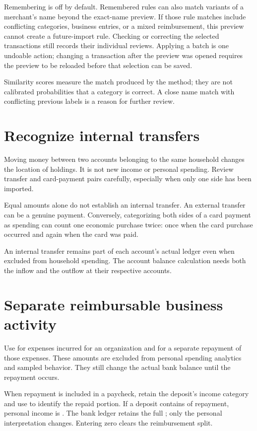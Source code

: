 Remembering is off by default. Remembered rules can also match variants of a merchant's name beyond the exact-name preview. If those rule matches include conflicting categories, business entries, or a mixed reimbursement, this preview cannot create a future-import rule. Checking or correcting the selected transactions still records their individual reviews. Applying a batch is one undoable action; changing a transaction after the preview was opened requires the preview to be reloaded before that selection can be saved.

Similarity scores measure the match produced by the method; they are not calibrated probabilities that a category is correct. A close name match with conflicting previous labels is a reason for further review.

\section{Recognize internal transfers}
Moving money between two accounts belonging to the same household changes the location of holdings. It is not new income or personal spending. Review transfer and card-payment pairs carefully, especially when only one side has been imported.

Equal amounts alone do not establish an internal transfer. An external transfer can be a genuine payment. Conversely, categorizing both sides of a card payment as spending can count one economic purchase twice: once when the card purchase occurred and again when the card was paid.

An internal transfer remains part of each account's actual ledger even when excluded from household spending. The account balance calculation needs both the inflow and the outflow at their respective accounts.

\section{Separate reimbursable business activity}
Use  for expenses incurred for an organization and for a separate repayment of those expenses. These amounts are excluded from personal spending analytics and sampled behavior. They still change the actual bank balance until the repayment occurs.

When repayment is included in a paycheck, retain the deposit's income category and use  to identify the repaid portion. If a  deposit contains  of repayment, personal income is . The bank ledger retains the full ; only the personal interpretation changes. Entering zero clears the reimbursement split.

